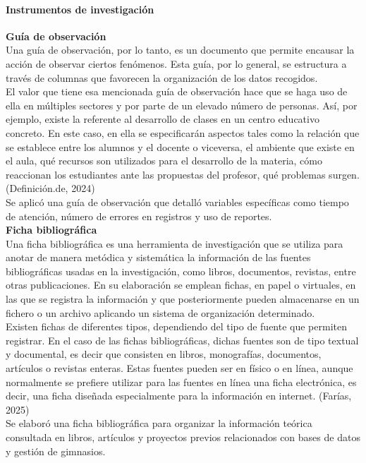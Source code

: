 \documentclass[12pt, letterpaper]{article}
\begin{document}
\paragraph{Instrumentos de investigación}
\textbf{Guía de observación}\\
Una guía de observación, por lo tanto, es un documento que permite encausar la acción de observar ciertos fenómenos. Esta guía, por lo general, se estructura a través de columnas que favorecen la organización de los datos recogidos.\\
El valor que tiene esa mencionada guía de observación hace que se haga uso de ella en múltiples sectores y por parte de un elevado número de personas. Así, por ejemplo, existe la referente al desarrollo de clases en un centro educativo concreto. En este caso, en ella se especificarán aspectos tales como la relación que se establece entre los alumnos y el docente o viceversa, el ambiente que existe en el aula, qué recursos son utilizados para el desarrollo de la materia, cómo reaccionan los estudiantes ante las propuestas del profesor, qué problemas surgen. (Definición.de, 2024)\\
Se aplicó una guía de observación que detalló variables específicas como tiempo de atención, número de errores en registros y uso de reportes.\\
\textbf{Ficha bibliográfica}\\
Una ficha bibliográfica es una herramienta de investigación que se utiliza para anotar de manera metódica y sistemática la información de las fuentes bibliográficas usadas en la investigación, como libros, documentos, revistas, entre otras publicaciones. En su elaboración se emplean fichas, en papel o virtuales, en las que se registra la información y que posteriormente pueden almacenarse en un fichero o un archivo aplicando un sistema de organización determinado.\\
Existen fichas de diferentes tipos, dependiendo del tipo de fuente que permiten registrar. En el caso de las fichas bibliográficas, dichas fuentes son de tipo textual y documental, es decir que consisten en libros, monografías, documentos, artículos o revistas enteras. Estas fuentes pueden ser en físico o en línea, aunque normalmente se prefiere utilizar para las fuentes en línea una ficha electrónica, es decir, una ficha diseñada especialmente para la información en internet. (Farías, 2025)\\
Se elaboró una ficha bibliográfica para organizar la información teórica consultada en libros, artículos y proyectos previos relacionados con bases de datos y gestión de gimnasios.\\
\newpage
\end{document}
